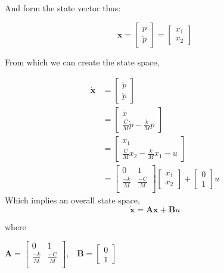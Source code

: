 And form the state vector thus:

\begin{equation}
    \mathbf{x} =
    \begin{bmatrix}
        p \\
        \dot{p}
    \end{bmatrix}
    =
    \begin{bmatrix}
        x_{1} \\
        x_{2}
    \end{bmatrix}
\end{equation}

From which we can create the state space,

\begin{align*}
    \mathbf{\dot{x}}
    &=
    \begin{bmatrix}
        \dot{p} \\
        \ddot{p}
    \end{bmatrix} \\
    &=
    \begin{bmatrix}
        \dot{x} \\
        \frac{C}{M}\dot{p} - \frac{k}{M}p
    \end{bmatrix} \\
    &=
    \begin{bmatrix}
        x_{1} \\
        \frac{C}{M}x_{2} - \frac{k}{M}x_{1} - u
    \end{bmatrix} \\
    &=
    \begin{bmatrix}
        0 & 1\\
        \frac{-k}{M} & \frac{-C}{M} \\
    \end{bmatrix}
    \begin{bmatrix}
        x_{1} \\
        x_{2}
    \end{bmatrix}
    +
    \begin{bmatrix}
        0 \\
        1
    \end{bmatrix}
    u
\end{align*}
Which implies an overall state space,
\begin{equation}
\mathbf{\dot{x}} = \mathbf{A}\mathbf{x} + \mathbf{B}u
\end{equation}

where

\begin{math}
    \mathbf{A} =
    \begin{bmatrix}
        0 & 1\\
        \frac{-k}{M} & \frac{-C}{M} \\
    \end{bmatrix}\textrm{,}\quad
    \mathbf{B} =
    \begin{bmatrix}
        0 \\
        1
    \end{bmatrix}
\end{math}

